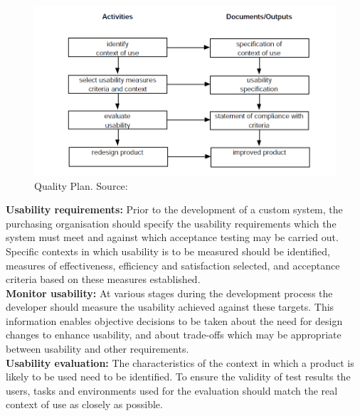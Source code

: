 \begin{figure}[H]
\caption{Quality Plan. Source: \cite{bevan1995human}}
\label{fig:usability2}
\includegraphics[scale=0.2]{img/usability2.png}
\end{figure} 

\textbf{Usability requirements:} Prior to the development of a custom system, the purchasing
organisation should specify the usability requirements which the system must meet and
against which acceptance testing may be carried out. Specific contexts in which usability is to
be measured should be identified, measures of effectiveness, efficiency and satisfaction
selected, and acceptance criteria based on these measures established. \\
\textbf{Monitor usability:} At various stages during the development process the developer should
measure the usability achieved against these targets. This information enables objective
decisions to be taken about the need for design changes to enhance usability, and about trade-offs
which may be appropriate between usability and other requirements. \\
\textbf{Usability evaluation:} The characteristics of the context in which a product is likely to be
used need to be identified. To ensure the validity of test results the users, tasks and
environments used for the evaluation should match the real context of use as closely as
possible.


